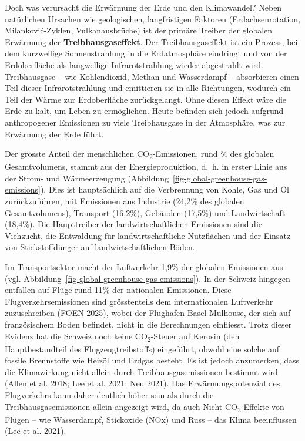\documentclass[
  nswissgerman,
  a4paper,
  DIV=11,
  numbers=noendperiod,
  oneside,
  openany]{scrreprt}
\begin{document}
Doch was verursacht die Erwärmung der Erde und den Klimawandel? Neben
natürlichen Ursachen wie geologischen, langfristigen Faktoren
(Erdachsenrotation, Milanković-Zyklen, Vulkanausbrüche) ist der primäre
Treiber der globalen Erwärmung der \textbf{Treibhausgaseffekt}. Der
Treibhausgaseffekt ist ein Prozess, bei dem kurzwellige Sonnenstrahlung
in die Erdatmosphäre eindringt und von der Erdoberfläche als langwellige
Infrarotstrahlung wieder abgestrahlt wird. Treibhausgase -- wie
Kohlendioxid, Methan und Wasserdampf -- absorbieren einen Teil dieser
Infrarotstrahlung und emittieren sie in alle Richtungen, wodurch ein
Teil der Wärme zur Erdoberfläche zurückgelangt. Ohne diesen Effekt wäre
die Erde zu kalt, um Leben zu ermöglichen. Heute befinden sich jedoch
aufgrund anthropogener Emissionen zu viele Treibhausgase in der
Atmosphäre, was zur Erwärmung der Erde führt.

Der grösste Anteil der menschlichen CO\textsubscript{2}-Emissionen, rund
¾ des globalen Gesamtvolumens, stammt aus der Energieproduktion, d.~h.
in erster Linie aus der Strom- und Wärmeerzeugung
(Abbildung~\ref{fig-global-greenhouse-gas-emissions}). Dies ist
hauptsächlich auf die Verbrennung von Kohle, Gas und Öl zurückzuführen,
mit Emissionen aus Industrie (24,2\% des globalen Gesamtvolumens),
Transport (16,2\%), Gebäuden (17,5\%) und Landwirtschaft (18,4\%). Die
Haupttreiber der landwirtschaftlichen Emissionen sind die Viehzucht, die
Entwaldung für landwirtschaftliche Nutzflächen und der Einsatz von
Stickstoffdünger auf landwirtschaftlichen Böden.

Im Transportsektor macht der Luftverkehr 1,9\% der globalen Emissionen
aus (vgl. Abbildung~\ref{fig-global-greenhouse-gas-emissions}). In der
Schweiz hingegen entfallen auf Flüge rund 11\% der nationalen
Emissionen. Diese Flugverkehrsemissionen sind grösstenteils dem
internationalen Luftverkehr zuzuschreiben (FOEN 2025), wobei der
Flughafen Basel-Mulhouse, der sich auf französischem Boden befindet,
nicht in die Berechnungen einfliesst. Trotz dieser Evidenz hat die
Schweiz noch keine CO\textsubscript{2}-Steuer auf Kerosin (den
Hauptbestandteil des Flugzeugtreibstoffs) eingeführt, obwohl eine solche
auf fossile Brennstoffe wie Heizöl und Erdgas besteht. Es ist jedoch
anzumerken, dass die Klimawirkung nicht allein durch
Treibhausgasemissionen bestimmt wird (Allen et al. 2018; Lee et al.
2021; Neu 2021). Das Erwärmungspotenzial des Flugverkehrs kann daher
deutlich höher sein als durch die Treibhausgasemissionen allein
angezeigt wird, da auch Nicht-CO\textsubscript{2}-Effekte von Flügen --
wie Wasserdampf, Stickoxide (NOx) und Russ -- das Klima beeinflussen
(Lee et al. 2021).
\end{document}

